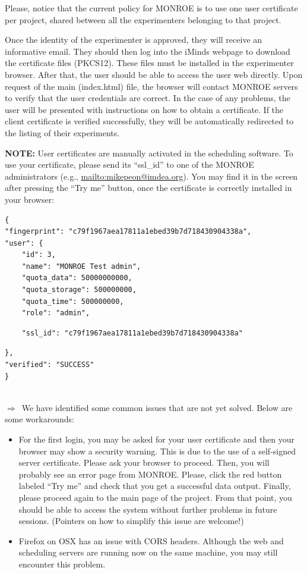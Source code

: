 \documentclass[a4paper,10pt]{article}
\newcommand{\VerbatimFont}{\footnotesize}
\newcommand{\monroe}{MONROE}
\begin{document}
Please, notice that the current policy for \monroe{} is to use one user certificate per project, shared between all the experimenters belonging to that project.

Once the identity of the experimenter is approved, they will receive an informative email.
They should then log into the iMinds webpage to download the certificate files (PKCS12).
These files must be installed in the experimenter browser.
After that, the user should be able to access the user web directly.
Upon request of the main (index.html) file, the browser will contact \monroe{} servers to verify that the user credentials are correct.
In the case of any problems, the user will be presented with instructions on how to obtain a certificate.
If the client certificate is verified successfully, they will be automatically redirected to the listing of their experiments.

\textbf{NOTE:} User certificates are manually activated in the scheduling software.
To use your certificate, please send its ``ssl\_id'' to one of the \monroe{} administrators (e.g., \url{mailto:mikepeon@imdea.org}).
You may find it in the screen after pressing the ``Try me'' button, once the certificate is correctly installed in your browser:
{\VerbatimFont\begin{verbatim}
{
"fingerprint": "c79f1967aea17811a1ebed39b7d718430904338a",
"user": {
    "id": 3,
    "name": "MONROE Test admin",
    "quota_data": 50000000000,
    "quota_storage": 500000000,
    "quota_time": 500000000,
    "role": "admin",
\end{verbatim}
\color{red}
\vspace{-0.7cm}
\begin{verbatim}
    "ssl_id": "c79f1967aea17811a1ebed39b7d718430904338a"
\end{verbatim}
\color{black}
\vspace{-0.7cm}
\begin{verbatim}
},
"verified": "SUCCESS"
}
\end{verbatim}}

~\\$\Rightarrow$~We have identified some common issues that are not yet solved. Below are some workarounds:
\begin{itemize}
	\item For the first login, you may be asked for your user certificate and then your browser may show a security warning. This is due to the use of a self-signed server certificate. Please ask your browser to proceed. Then, you will probably see an error page from \monroe{}. Please, click the red button labeled ``Try me'' and check that you get a successful data output. Finally, please proceed again to the main page of the project. From that point, you should be able to access the system without further problems in future sessions. (Pointers on how to simplify this issue are welcome!)
	\item Firefox on OSX has an issue with CORS headers. Although the web and scheduling servers are running now on the same machine, you may still encounter this problem.
\end{itemize}
\end{document}
